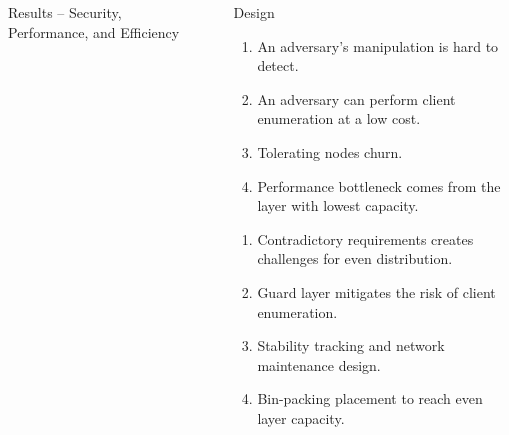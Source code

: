 \documentclass[final]{beamer}
\newlength{\sepwidth}
\newlength{\maincolwidth}
\newlength{\rightcolwidth}
\newcommand{\separatorcolumn}{\begin{column}{\sepwidth}\end{column}}
\begin{document}
\begin{frame}[t]
\begin{columns}[t]
\begin{column}{\maincolwidth}
\begin{alertblock}{Results -- Security, Performance, and Efficiency}
%     
%     
  
  \end{alertblock}
\end{column}

\separatorcolumn

\begin{column}{\rightcolwidth}

  \begin{block}{Design}
  \begin{enumerate}
    \item An adversary's manipulation is hard to detect.
    \item An adversary can perform client enumeration at a low cost.
    \item Tolerating nodes churn.
    \item Performance bottleneck comes from the layer with lowest capacity.
  \end{enumerate}
      
    \begin{enumerate}
    \item Contradictory requirements creates challenges for even distribution.
    \item Guard layer mitigates the risk of client enumeration.
    \item Stability tracking and network maintenance design.
    \item Bin-packing placement to reach even layer capacity.
    \end{enumerate}
    

\end{block}
\end{column}
\end{columns}
\end{frame}
\end{document}
